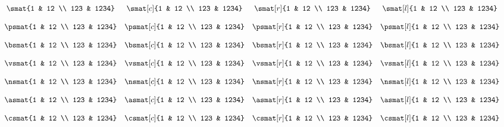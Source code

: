 \documentclass{unittest}
\begin{document}
\(\begin{array}{ccccc}
\\\\%
&	\smat{1 & 12 \\ 123 & 1234}
&	\smat[c]{1 & 12 \\ 123 & 1234}
&	\smat[r]{1 & 12 \\ 123 & 1234}
&	\smat[l]{1 & 12 \\ 123 & 1234}
\\\\%
&	\psmat{1 & 12 \\ 123 & 1234}
&	\psmat[c]{1 & 12 \\ 123 & 1234}
&	\psmat[r]{1 & 12 \\ 123 & 1234}
&	\psmat[l]{1 & 12 \\ 123 & 1234}
\\\\%
&	\bsmat{1 & 12 \\ 123 & 1234}
&	\bsmat[c]{1 & 12 \\ 123 & 1234}
&	\bsmat[r]{1 & 12 \\ 123 & 1234}
&	\bsmat[l]{1 & 12 \\ 123 & 1234}
\\\\%
&	\vsmat{1 & 12 \\ 123 & 1234}
&	\vsmat[c]{1 & 12 \\ 123 & 1234}
&	\vsmat[r]{1 & 12 \\ 123 & 1234}
&	\vsmat[l]{1 & 12 \\ 123 & 1234}
\\\\%
&	\nsmat{1 & 12 \\ 123 & 1234}
&	\nsmat[c]{1 & 12 \\ 123 & 1234}
&	\nsmat[r]{1 & 12 \\ 123 & 1234}
&	\nsmat[l]{1 & 12 \\ 123 & 1234}
\\\\%
&	\asmat{1 & 12 \\ 123 & 1234}
&	\asmat[c]{1 & 12 \\ 123 & 1234}
&	\asmat[r]{1 & 12 \\ 123 & 1234}
&	\asmat[l]{1 & 12 \\ 123 & 1234}
\\\\%
&	\csmat{1 & 12 \\ 123 & 1234}
&	\csmat[c]{1 & 12 \\ 123 & 1234}
&	\csmat[r]{1 & 12 \\ 123 & 1234}
&	\csmat[l]{1 & 12 \\ 123 & 1234}
\\\\%
\end{array}\)
\end{document}
